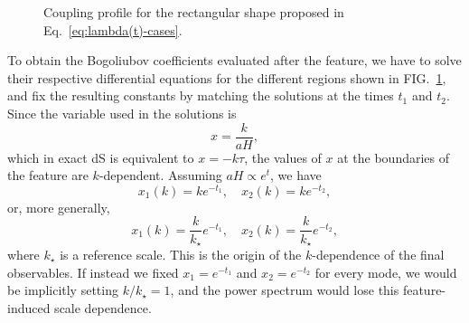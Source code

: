 \documentclass[
 aip,
 jmp,
 amsmath,amssymb,
 reprint,
 nofootinbib,
]{revtex4-2}
\begin{document}
\begin{figure}[h]
\centering

\def\tone{-3.2}
\def\ttwo{2.9}
\def\lambdazero{1.4}
\def\lambdaLabelY{1.58}
\def\xmin{-5}
\def\xmax{5}
\def\regionLabelY{0.45}

\caption{Coupling profile for the rectangular shape proposed in Eq.~\eqref{eq:lambda(t)-cases}.}
\label{fig:rectangular-function-lambda}
\end{figure}

To obtain the Bogoliubov coefficients evaluated after the feature, we have to solve their respective differential equations for the different regions shown in FIG.~\ref{fig:rectangular-function-lambda}, and fix the resulting constants by matching the solutions at the times $t_1$ and $t_2$. Since the variable used in the solutions is
\begin{equation}
    x = \frac{k}{aH},
\end{equation}
which in exact dS is equivalent to $x=-k\tau$, the values of $x$ at the boundaries of the feature are $k$-dependent. Assuming $aH \propto e^t$, we have
\begin{equation}
    x_1(k) = k e^{-t_1}, \quad x_2(k) = k e^{-t_2},
\end{equation}
or, more generally,
\begin{equation}
    x_1(k) = \frac{k}{k_\star} e^{-t_1}, \quad x_2(k) = \frac{k}{k_\star} e^{-t_2},
\end{equation}
where $k_\star$ is a reference scale. This is the origin of the $k$-dependence of the final observables. If instead we fixed $x_1=e^{-t_1}$ and $x_2=e^{-t_2}$ for every mode, we would be implicitly setting $k/k_\star=1$, and the power spectrum would lose this feature-induced scale dependence.
\end{document}
